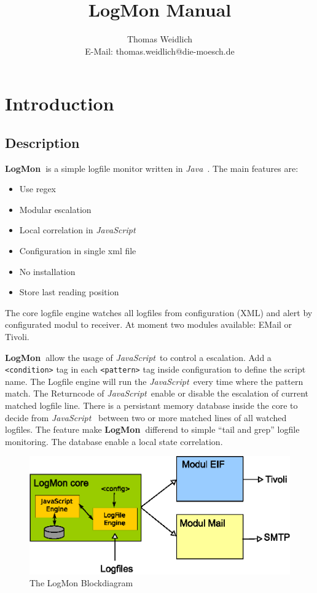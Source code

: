 \documentclass[11pt,a4paper]{article}
\title{LogMon Manual}
\author{Thomas Weidlich\\E-Mail: thomas.weidlich@die-moesch.de}
\newcommand{\logmon}{\textbf{LogMon\ }}
\newcommand{\js}{\textit{JavaScript\ }}
\newcommand{\java}{\textit{Java\ }}
\begin{document}
\maketitle
\tableofcontents
\newpage
\section{Introduction}
\subsection{Description}

\logmon is a simple logfile monitor written in \java. The main features are:

\begin{itemize}
  \item Use regex
  \item Modular escalation
  \item Local correlation in \js
  \item Configuration in single xml file
  \item No installation
  \item Store last reading position
\end{itemize}

The core logfile engine watches all logfiles from configuration (XML) and alert
by configurated modul to receiver. At moment two modules available: EMail or
Tivoli.

\logmon allow the usage of \js to control a escalation. Add a
\verb#<condition># tag in each \verb#<pattern># tag inside configuration to
define the script name.
The Logfile engine will run the \js every time where the pattern match. The
Returncode of \js enable or disable the escalation of current matched logfile
line. There is a persistant memory database inside the core to decide from \js
between two or more matched lines of all watched logfiles. The feature make
\logmon differend to simple ``tail and grep'' logfile monitoring. The database
enable a local state correlation.

\begin{figure}[htb]
\centering
\includegraphics{img/LogMon.eps}
\caption{The LogMon Blockdiagram}
\label{graph:block}
\end{figure}
\end{document}

